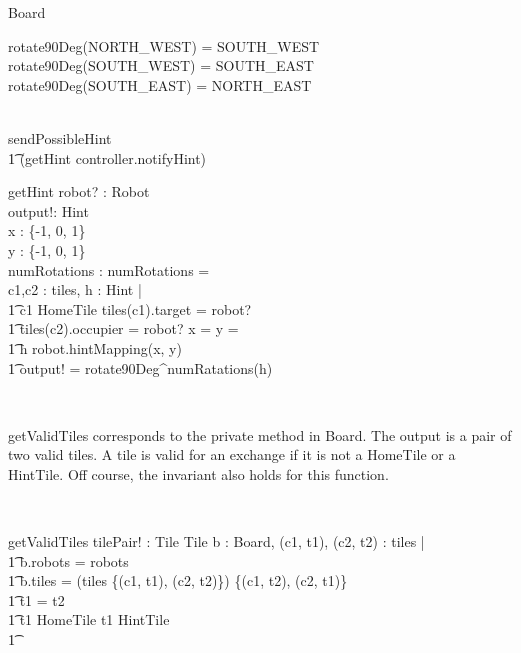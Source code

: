 \begin{class}{Board}
\begin{axdef}
rotate90Deg(NORTH\_WEST) = SOUTH\_WEST \\
rotate90Deg(SOUTH\_WEST) = SOUTH\_EAST \\
rotate90Deg(SOUTH\_EAST) = NORTH\_EAST
\end{axdef} \\
sendPossibleHint \sdef [robot? : Robot | \\ \t2 \neg \exists c : \ran tiles | c \in HintTile \wedge c.occupier = robot?] \; \; [] \\ \t1
(getHint \comp controller.notifyHint) \\
\begin{schema}{getHint}
robot? : Robot \\
output!: Hint \\
\delta x : \{-1, 0, 1\} \\
\delta y : \{-1, 0, 1\} \\
numRotations : \nat
\where
numRotations =  \\
\also \also \also \also \also
\exists c1,c2 : \ran tiles, h : Hint | \\ \t1 c1 \in HomeTile \wedge
 tiles(c1).target = robot? \; \; \wedge \\ \t1 tiles(c2).occupier = robot? \wedge
 \delta x =  \wedge \delta y =  \; \; \wedge \\ \t1
 h \in robot.hintMapping(\delta x, \delta y) \; \; \wedge \\ \t1
 output! = rotate90Deg^{numRatations}(h)
\end{schema} \\
\znewpage
\begin{classcom}
getValidTiles corresponds to the private method in Board. The output is a pair of two valid tiles. A tile is valid for an exchange if it is not a HomeTile or a HintTile. Off course, the invariant also holds for this function.
\end{classcom} \\
\begin{schema}{getValidTiles}
tilePair! : Tile \cross Tile
\where
\exists b : Board, (c1, t1), (c2, t2) : tiles | \\ \t1
b.robots = robots \;\; \wedge \\ \t1
 b.tiles = (tiles \setminus \{(c1, t1), (c2, t2)\}) \cup \{(c1, t2), (c2, t1)\} \\ \t1
t1 \not = t2 \; \;  \wedge \\ \t1
t1 \not \in HomeTile \wedge t1 \not \in HintTile \; \; \wedge \\ \t1

\end{schema}
\end{class}
